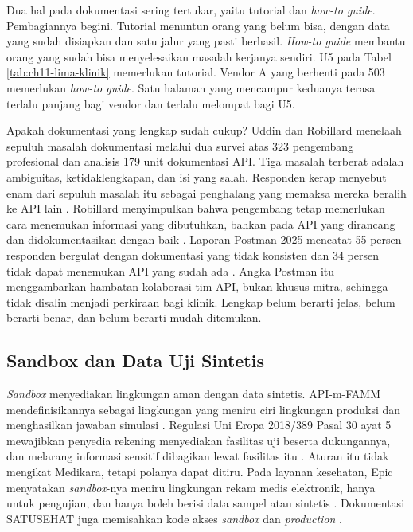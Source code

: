 Dua hal pada dokumentasi sering tertukar, yaitu tutorial dan \textit{how-to guide}. Pembagiannya begini. Tutorial menuntun
orang yang belum bisa, dengan data yang sudah disiapkan dan satu jalur yang pasti berhasil. \textit{How-to guide} membantu
orang yang sudah bisa menyelesaikan masalah kerjanya sendiri. U5 pada Tabel \ref{tab:ch11-lima-klinik} memerlukan tutorial.
Vendor A yang berhenti pada 503 memerlukan \textit{how-to guide}. Satu halaman yang mencampur keduanya terasa terlalu
panjang bagi vendor dan terlalu melompat bagi U5.

Apakah dokumentasi yang lengkap sudah cukup? Uddin dan Robillard menelaah sepuluh masalah dokumentasi melalui dua survei
atas 323 pengembang profesional dan analisis 179 unit dokumentasi API. Tiga masalah terberat adalah ambiguitas,
ketidaklengkapan, dan isi yang salah. Responden kerap menyebut enam dari sepuluh masalah itu sebagai penghalang yang
memaksa mereka beralih ke API lain \cite{c11-uddin2015}. Robillard menyimpulkan bahwa pengembang tetap memerlukan cara
menemukan informasi yang dibutuhkan, bahkan pada API yang dirancang dan didokumentasikan dengan baik
\cite{c11-robillard2009}. Laporan Postman 2025 mencatat 55 persen responden bergulat dengan dokumentasi yang tidak
konsisten dan 34 persen tidak dapat menemukan API yang sudah ada \cite{postman2025}. Angka Postman itu menggambarkan hambatan
kolaborasi tim API, bukan khusus mitra, sehingga tidak disalin menjadi perkiraan bagi klinik. Lengkap belum berarti jelas,
belum berarti benar, dan belum berarti mudah ditemukan.

\subsection{Sandbox dan Data Uji Sintetis}

\textit{Sandbox} menyediakan lingkungan aman dengan data sintetis. API-m-FAMM mendefinisikannya sebagai lingkungan yang
meniru ciri lingkungan produksi dan menghasilkan jawaban simulasi \cite{mathijssen2020}. Regulasi Uni Eropa 2018/389
Pasal 30 ayat 5 mewajibkan penyedia rekening menyediakan fasilitas uji beserta dukungannya, dan melarang informasi sensitif
dibagikan lewat fasilitas itu \cite{rts2018}. Aturan itu tidak mengikat Medikara, tetapi polanya dapat ditiru. Pada
layanan kesehatan, Epic menyatakan \textit{sandbox}-nya meniru lingkungan rekam medis elektronik, hanya untuk pengujian, dan
hanya boleh berisi data sampel atau sintetis \cite{c11-epic-sandbox}. Dokumentasi SATUSEHAT juga memisahkan kode akses
\textit{sandbox} dan \textit{production} \cite{satusehat}.

